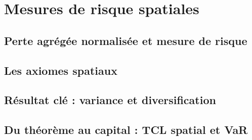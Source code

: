 \section{Mesures de risque spatiales}
\subsection{Perte agrégée normalisée et mesure de risque}
\subsection{Les axiomes spatiaux}
\subsection{Résultat clé : variance et diversification}
\subsection{Du théorème au capital : TCL spatial et VaR}
